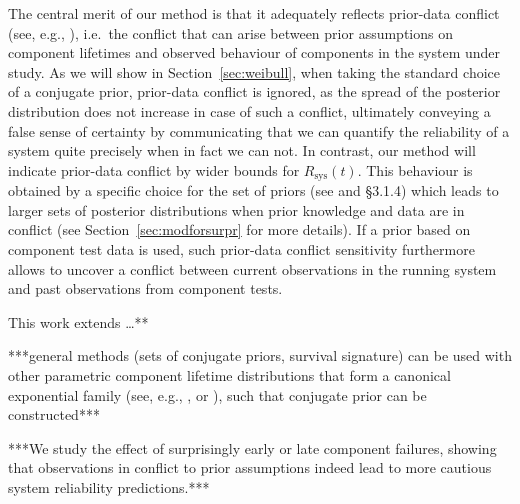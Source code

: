 \documentclass[Journal,SectionNumbers,SingleSpace,InsideFigs]{ascelike}
\newcommand{\Rsys}{R_\text{sys}}
\def\Rsys{R_\text{sys}}
\begin{document}
The central merit of our method is that it adequately reflects prior-data conflict
(see, e.g., ),
i.e.\ the conflict that can arise between prior assumptions on component lifetimes
and observed behaviour of components in the system under study.
As we will show in Section~\ref{sec:weibull}, when taking the standard choice of a conjugate prior,
prior-data conflict is ignored, as the spread of the posterior distribution does not increase in case of such a conflict,
ultimately conveying a false sense of certainty
by communicating that we can quantify the reliability of a system quite precisely when in fact we can not.
%
In contrast, our method will indicate prior-data conflict by wider bounds for $\Rsys(t)$.
This behaviour is obtained by a specific choice for the set of priors (see  and  \S 3.1.4)
which leads to larger sets of posterior distributions when prior knowledge and data are in conflict
(see Section~\ref{sec:modforsurpr} for more details).
If a prior based on component test data is used,
such prior-data conflict sensitivity furthermore allows to uncover a conflict between
current observations in the running system and past observations from component tests.


This work extends \ldots ***

***general methods (sets of conjugate priors, survival signature)
can be used with other parametric component lifetime distributions
that form a canonical exponential family
(see, e.g., , or ),
such that conjugate prior can be constructed***

***We study the effect of surprisingly early or late component failures,
showing that observations in conflict to prior assumptions
indeed lead to more cautious system reliability predictions.***
\end{document}
